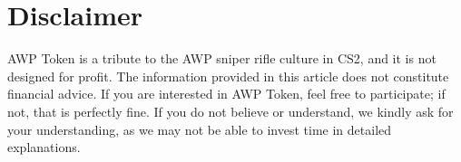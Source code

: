 \documentclass[journal,onecolumn,]{IEEEtran}
\begin{document}
	
	\section*{Disclaimer}
	
	AWP Token is a tribute to the AWP sniper rifle culture in CS2, and it is not designed for profit. The information provided in this article does not constitute financial advice. If you are interested in AWP Token, feel free to participate; if not, that is perfectly fine. If you do not believe or understand, we kindly ask for your understanding, as we may not be able to invest time in detailed explanations.
	
	
	\vfill
	
	 
	
	
	
	
	
\end{document}
